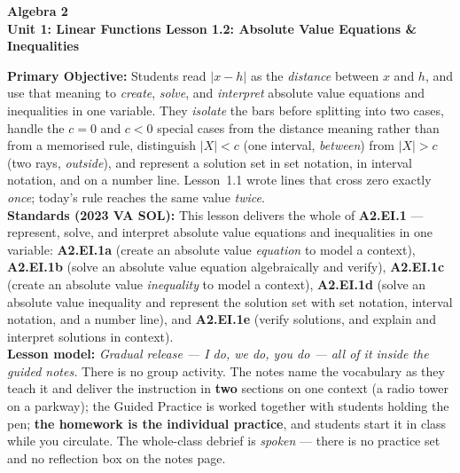 \documentclass[10pt]{article}
\newcommand{\CourseName}{Algebra 2}
\newcommand{\UnitNumberName}{Unit 1: Linear Functions \quad}
\newcommand{\LessonNumberName}{Lesson 1.2: Absolute Value Equations \& Inequalities}
\begin{document}
\begin{center}
    {\Large\bfseries \CourseName \\
    {\small\bfseries \UnitNumberName \LessonNumberName}}
\end{center}

\begin{tcolorbox}[colback=forestbg, colframe=forest, boxrule=0.9pt, arc=2mm,
    left=2mm, right=2mm, top=1.5mm, bottom=1.5mm]
    \textbf{Primary Objective:} Students read $|x-h|$ as the \emph{distance} between $x$ and $h$,
    and use that meaning to \emph{create}, \emph{solve}, and \emph{interpret} absolute value
    equations and inequalities in one variable. They \emph{isolate} the bars before splitting into
    two cases, handle the $c=0$ and $c<0$ special cases from the distance meaning rather than from a
    memorised rule, distinguish $|X|<c$ (one interval, \emph{between}) from $|X|>c$ (two rays,
    \emph{outside}), and represent a solution set in set notation, in interval notation, and on a
    number line. Lesson~1.1 wrote lines that cross zero exactly \emph{once}; today's rule reaches
    the same value \emph{twice}.
    \\[2pt]
    \textbf{Standards (2023 VA SOL):} This lesson delivers the whole of \textbf{A2.EI.1} ---
    represent, solve, and interpret absolute value equations and inequalities in one variable:
    \textbf{A2.EI.1a} (create an absolute value \emph{equation} to model a context),
    \textbf{A2.EI.1b} (solve an absolute value equation algebraically and verify),
    \textbf{A2.EI.1c} (create an absolute value \emph{inequality} to model a context),
    \textbf{A2.EI.1d} (solve an absolute value inequality and represent the solution set with set
    notation, interval notation, and a number line), and \textbf{A2.EI.1e} (verify solutions, and
    explain and interpret solutions in context).
    \\[2pt]
    \textbf{Lesson model:} \emph{Gradual release --- I do, we do, you do --- all of it inside the
    guided notes.} There is no group activity. The notes name the vocabulary as they teach it and
    deliver the instruction in \textbf{two} sections on one context (a radio tower on a parkway);
    the Guided Practice is worked together with students holding the pen; \textbf{the homework is
    the individual practice}, and students start it in class while you circulate. The whole-class
    debrief is \emph{spoken} --- there is no practice set and no reflection box on the notes page.
\end{tcolorbox}
\end{document}
